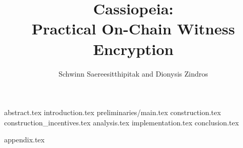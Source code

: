 \documentclass[runningheads]{llncs}
\begin{document}
\title{Cassiopeia:\\
Practical On-Chain Witness Encryption
}
\author{Schwinn Saereesitthipitak and Dionysis Zindros}

\maketitle              %

{abstract.tex}
{introduction.tex}
{preliminaries/main.tex}
{construction.tex}
{construction_incentives.tex}
{analysis.tex}
{implementation.tex}
{conclusion.tex}

\nocite{momo}


{appendix.tex}
\end{document}
